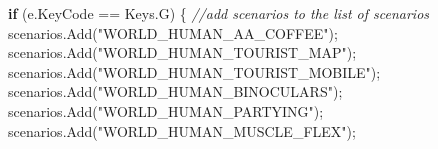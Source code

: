 \documentclass[
  openany]{book}
\newenvironment{Shaded}{\begin{snugshade}}{\end{snugshade}}
\newcommand{\CommentTok}[1]{\textcolor[rgb]{0.56,0.35,0.01}{\textit{#1}}}
\newcommand{\FunctionTok}[1]{\textcolor[rgb]{0.00,0.00,0.00}{#1}}
\newcommand{\KeywordTok}[1]{\textcolor[rgb]{0.13,0.29,0.53}{\textbf{#1}}}
\newcommand{\NormalTok}[1]{#1}
\newcommand{\StringTok}[1]{\textcolor[rgb]{0.31,0.60,0.02}{#1}}
\begin{document}
\begin{Shaded}
\begin{Highlighting}[]
            \KeywordTok{if}\NormalTok{ (e.}\FunctionTok{KeyCode}\NormalTok{ == Keys.}\FunctionTok{G}\NormalTok{)}
\NormalTok{            \{}
                \CommentTok{//add scenarios to the list of scenarios}
\NormalTok{                scenarios.}\FunctionTok{Add}\NormalTok{(}\StringTok{"WORLD_HUMAN_AA_COFFEE"}\NormalTok{);}
\NormalTok{                    scenarios.}\FunctionTok{Add}\NormalTok{(}\StringTok{"WORLD_HUMAN_TOURIST_MAP"}\NormalTok{);}
\NormalTok{                    scenarios.}\FunctionTok{Add}\NormalTok{(}\StringTok{"WORLD_HUMAN_TOURIST_MOBILE"}\NormalTok{);}
\NormalTok{                    scenarios.}\FunctionTok{Add}\NormalTok{(}\StringTok{"WORLD_HUMAN_BINOCULARS"}\NormalTok{);}
\NormalTok{                    scenarios.}\FunctionTok{Add}\NormalTok{(}\StringTok{"WORLD_HUMAN_PARTYING"}\NormalTok{);}
\NormalTok{                    scenarios.}\FunctionTok{Add}\NormalTok{(}\StringTok{"WORLD_HUMAN_MUSCLE_FLEX"}\NormalTok{);}


\end{Highlighting}
\end{Shaded}
\end{document}
